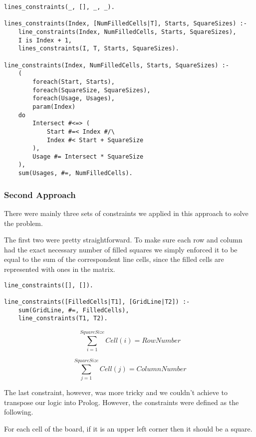 \documentclass[runningheads]{llncs}
\begin{document}
\begin{verbatim}
lines_constraints(_, [], _, _).

lines_constraints(Index, [NumFilledCells|T], Starts, SquareSizes) :-
    line_constraints(Index, NumFilledCells, Starts, SquareSizes),
    I is Index + 1,
    lines_constraints(I, T, Starts, SquareSizes).

line_constraints(Index, NumFilledCells, Starts, SquareSizes) :-
    (
        foreach(Start, Starts),
        foreach(SquareSize, SquareSizes),
        foreach(Usage, Usages),
        param(Index)
    do
        Intersect #<=> (
            Start #=< Index #/\ 
            Index #< Start + SquareSize
        ),
        Usage #= Intersect * SquareSize
    ),
    sum(Usages, #=, NumFilledCells).
\end{verbatim}

\subsubsection{Second Approach}

There were mainly three sets of constraints we applied in this approach to solve the problem.

The first two were pretty straightforward. To make sure each row and column had the exact necessary number of filled squares we simply enforced it to be equal to the sum of the correspondent line cells, since the filled cells are represented with ones in the matrix.

\begin{verbatim}
line_constraints([], []).

line_constraints([FilledCells|T1], [GridLine|T2]) :-
    sum(GridLine, #=, FilledCells),
    line_constraints(T1, T2).
\end{verbatim}

\begin{equation}
    \sum_{i = 1}^{Square Size} Cell(i) = Row Number
\end{equation}

\begin{equation}
    \sum_{j = 1}^{Square Size} Cell(j) = Column Number
\end{equation}

The last constraint, however, was more tricky and we couldn't achieve to transpose our logic into Prolog. However, the constraints were defined as the following.

For each cell of the board, if it is an upper left corner then it should be a square.
\end{document}
